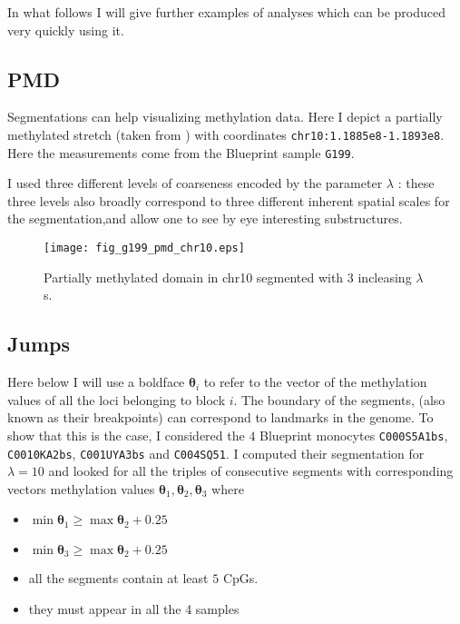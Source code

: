\documentclass[12pt]{amsart}
\begin{document}
In what follows I will give further examples of analyses 
which can be 
produced very quickly using it. 

\subsection{PMD}

Segmentations can help visualizing methylation data. Here I 
depict a partially methylated stretch (taken from \cite{pmd})
 with coordinates 
\texttt{chr10:1.1885e8-1.1893e8}. Here the measurements come 
from the Blueprint sample \texttt{G199}. 

I used three different levels of coarseness encoded by the parameter $\lambda$ : 
these three levels also broadly correspond to three different inherent 
spatial scales for the segmentation,and allow one to 
see by eye interesting substructures. 

\begin{figure}\label{fig_g199_pmd_chr10.eps}
\texttt{[image: fig\_g199\_pmd\_chr10.eps]}
\caption{Partially methylated domain in chr10 segmented with $3$ incleasing $\lambda$s.}
\end{figure}

\subsection{Jumps}

Here below I will use a boldface
$\pmb{\theta}_i$ to refer to the vector of the methylation values 
of all the loci belonging to 
block $i$.  
The boundary of the segments, (also known as their breakpoints)
can correspond to landmarks in the genome. To show that this is the case, 
I considered the 
$4$ Blueprint monocytes \texttt{C000S5A1bs}, \texttt{C0010KA2bs},
\texttt{C001UYA3bs} and \texttt{C004SQ51}.
I computed their segmentation for $\lambda=10$ and looked for all the triples of 
consecutive segments
with corresponding vectors methylation values 
$\pmb{\theta}_{1},\pmb{\theta}_{2},\pmb{\theta}_{3}$
where 
\begin{itemize}
\item{} $\min \pmb{\theta}_1 \geq \max \pmb{\theta}_2 + 0.25$
\item{} $\min \pmb{\theta}_{3} \geq \max \pmb{\theta}_2 + 0.25$
\item{} all the segments contain at least $5$ CpGs.
\item{} they must appear in all the 4 samples
\end{itemize}
\end{document}
